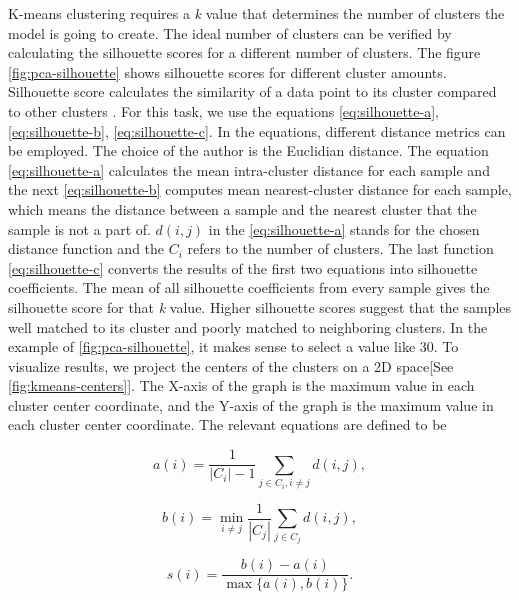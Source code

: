 K-means clustering requires a \textit{k} value that determines the number of clusters the model is going to create. The ideal number of clusters can be verified by calculating the silhouette scores for a different number of clusters. The figure \ref{fig:pca-silhouette} shows silhouette scores for different cluster amounts. Silhouette score calculates the similarity of a data point to its cluster compared to other clusters \parencite{rousseeuw1987silhouettes}. For this task, we use the equations \eqref{eq:silhouette-a}, \eqref{eq:silhouette-b}, \eqref{eq:silhouette-c}. In the equations, different distance metrics can be employed. The choice of the author is the Euclidian distance.  The equation \eqref{eq:silhouette-a} calculates the mean intra-cluster distance for each sample and the next \eqref{eq:silhouette-b} computes mean nearest-cluster distance for each sample, which means the distance between a sample and the nearest cluster that the sample is not a part of. $d(i, j)$ in the \eqref{eq:silhouette-a} stands for the chosen distance function and the $C_{i}$ refers to the number of clusters. The last function \eqref{eq:silhouette-c} converts the results of the first two equations into silhouette coefficients. The mean of all silhouette coefficients from every sample gives the silhouette score for that \textit{k} value. Higher silhouette scores suggest that the samples well matched to its cluster and poorly matched to neighboring clusters. In the example of \ref{fig:pca-silhouette}, it makes sense to select a value like 30. To visualize results, we project the centers of the clusters on a 2D space[See \ref{fig:kmeans-centers}]. The X-axis of the graph is the maximum value in each cluster center coordinate, and the Y-axis of the graph is the maximum value in each cluster center coordinate. The relevant equations are defined to be

\begin{equation}
a(i)=\frac{1}{\left|C_{i}\right|-1} \sum_{j \in C_{i}, i \neq j} d(i, j) , 
\label{eq:silhouette-a}
\end{equation}

\begin{equation}
b(i)=\min _{i \neq j} \frac{1}{\left|C_{j}\right|} \sum_{j \in C_{j}} d(i, j) ,
\label{eq:silhouette-b}
\end{equation}

\begin{equation}
s(i)=\frac{b(i)-a(i)}{\max \{a(i), b(i)\}} .
\label{eq:silhouette-c}
\end{equation}

